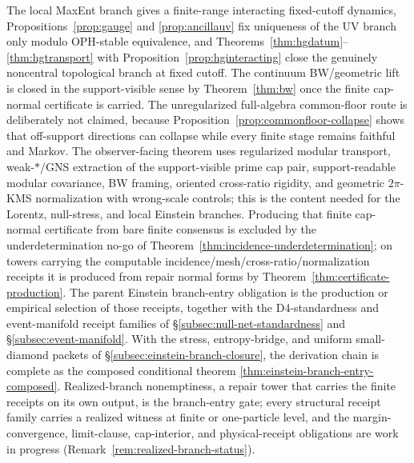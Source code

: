 \documentclass[11pt]{article}
\begin{document}
The local MaxEnt branch gives a finite-range interacting fixed-cutoff dynamics, Propositions~\ref{prop:gauge} and \ref{prop:ancillauv} fix uniqueness of the UV branch only modulo OPH-stable equivalence, and Theorems~\ref{thm:hgdatum}--\ref{thm:hgtransport} with Proposition~\ref{prop:hginteracting} close the genuinely noncentral topological branch at fixed cutoff. The continuum BW/geometric lift is closed in the support-visible sense by Theorem~\ref{thm:bw} once the finite cap-normal certificate is carried. The unregularized full-algebra common-floor route is deliberately not claimed, because Proposition~\ref{prop:commonfloor-collapse} shows that off-support directions can collapse while every finite stage remains faithful and Markov. The observer-facing theorem uses regularized modular transport, weak-\(*\)/GNS extraction of the support-visible prime cap pair, support-readable modular covariance, BW framing, oriented cross-ratio rigidity, and geometric \(2\pi\)-KMS normalization with wrong-scale controls; this is the content needed for the Lorentz, null-stress, and local Einstein branches. Producing that finite cap-normal certificate from bare finite consensus is excluded by the underdetermination no-go of Theorem~\ref{thm:incidence-underdetermination}; on towers carrying the computable incidence/mesh/cross-ratio/normalization receipts it is produced from repair normal forms by Theorem~\ref{thm:certificate-production}. The parent Einstein branch-entry obligation is the production or empirical selection of those receipts, together with the D4-standardness and event-manifold receipt families of \S\ref{subsec:null-net-standardness} and \S\ref{subsec:event-manifold}. With the stress, entropy-bridge, and uniform small-diamond packets of \S\ref{subsec:einstein-branch-closure}, the derivation chain is complete as the composed conditional theorem \ref{thm:einstein-branch-entry-composed}. Realized-branch nonemptiness, a repair tower that carries the finite receipts on its own output, is the branch-entry gate; every structural receipt family carries a realized witness at finite or one-particle level, and the margin-convergence, limit-clause, cap-interior, and physical-receipt obligations are work in progress (Remark~\ref{rem:realized-branch-status}).
\end{document}
